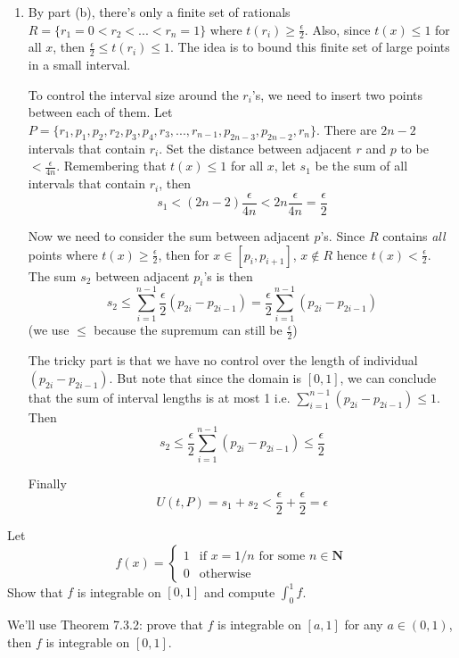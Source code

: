 \documentclass{oxmathproblems}
\begin{document}
\begin{questions}
\begin{solution}
\begin{enumerate}[label=(\alph*)]
    \item By part (b), there's only a finite set of rationals $R = \{r_{1}=0 < r_{2} < ... < r_{n}=1\}$ where $t(r_{i}) \geq \frac{\epsilon}{2}$.
    Also, since $t(x) \leq 1$ for all $x$, then $\frac{\epsilon}{2} \leq t(r_{i}) \leq 1$.
    The idea is to bound this finite set of large points in a small interval.

    To control the interval size around the $r_{i}$'s, we need to insert two points between each of them. Let $P = \{r_{1}, p_{1}, p_{2}, r_{2}, p_{3}, p_{4}, r_{3}, ..., r_{n-1}, p_{2n-3}, p_{2n-2}, r_{n}\}$.
    There are $2n-2$ intervals that contain $r_{i}$. Set the distance between adjacent $r$ and $p$ to be $< \frac{\epsilon}{4n}$. Remembering that $t(x) \leq 1$ for all $x$, let $s_{1}$ be the sum of all intervals
    that contain $r_{i}$, then
    \[s_{1} < (2n-2) \frac{\epsilon}{4n} < 2n\frac{\epsilon}{4n} = \frac{\epsilon}{2}\]

    Now we need to consider the sum between adjacent $p$'s. Since $R$ contains \textit{all} points where $t(x) \geq \frac{\epsilon}{2}$,
    then for $x \in [p_{i}, p_{i+1}]$, $x \notin R$ hence $t(x) < \frac{\epsilon}{2}$. The sum $s_{2}$ between adjacent $p_{i}$'s is then
    \[s_{2} \leq \sum_{i=1}^{n-1}\frac{\epsilon}{2}(p_{2i}-p_{2i-1}) = \frac{\epsilon}{2}\sum_{i=1}^{n-1}(p_{2i}-p_{2i-1})\]
    (we use $\leq$ because the supremum can still be $\frac{\epsilon}{2}$)

    The tricky part is that we have no control over the length of individual $(p_{2i}-p_{2i-1})$. But note that since the domain is $[0, 1]$, we can conclude
    that the sum of interval lengths is at most 1 i.e. $\sum_{i=1}^{n-1}(p_{2i}-p_{2i-1}) \leq 1$. Then
    \[s_{2} \leq \frac{\epsilon}{2}\sum_{i=1}^{n-1}(p_{2i}-p_{2i-1}) \leq \frac{\epsilon}{2}\]

    Finally
    \[U(t, P) = s_{1} + s_{2} < \frac{\epsilon}{2}+\frac{\epsilon}{2} = \epsilon\]
  \end{enumerate}
\end{solution}

\miquestion Let
\[f(x) =
  \begin{cases}
    1 & \text{if } x = 1/n \text{ for some } n \in \textbf{N}\\
    0 & \text{otherwise}
  \end{cases}
\]  
Show that $f$ is integrable on $[0, 1]$ and compute $\int_{0}^{1}f$.

\begin{solution}
  We'll use Theorem 7.3.2: prove that $f$ is integrable on $[a, 1]$ for any $a \in (0, 1)$, then $f$ is integrable on $[0, 1]$.


\end{solution}
\end{questions}
\end{document}
